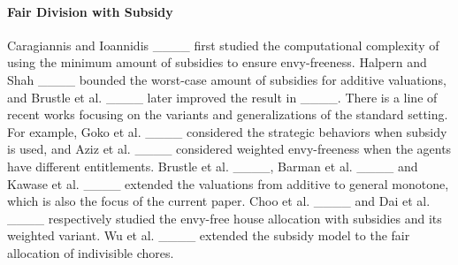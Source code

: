 


\paragraph{Fair Division with Subsidy}
Caragiannis and Ioannidis ____ first studied the computational complexity of using the minimum amount of subsidies to ensure envy-freeness.
Halpern and Shah ____ bounded the worst-case amount of subsidies for additive valuations, and Brustle et al. ____ later improved the result in ____.
There is a line of recent works focusing on the variants and generalizations of the standard setting.
For example, Goko et al. ____ considered the strategic behaviors when subsidy is used, and Aziz et al. ____ considered weighted envy-freeness when the agents have different entitlements.
Brustle et al. ____, Barman et al. ____ and Kawase et al. ____ extended the valuations from additive to general monotone, which is also the focus of the current paper.
Choo et al. ____ and Dai et al. ____ respectively studied the envy-free house allocation with subsidies and its weighted variant. 
Wu et al. ____ extended the subsidy model to the fair allocation of indivisible chores.